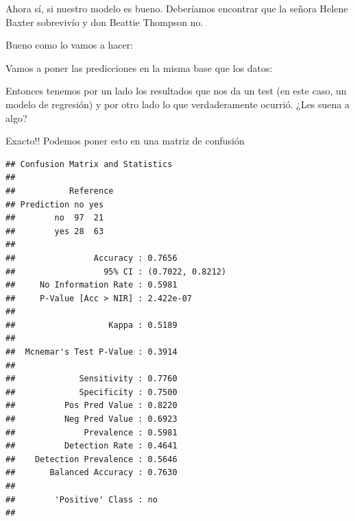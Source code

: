 \documentclass[
]{book}
\newenvironment{Shaded}{\begin{snugshade}}{\end{snugshade}}
\newcommand{\AttributeTok}[1]{\textcolor[rgb]{0.77,0.63,0.00}{#1}}
\newcommand{\FunctionTok}[1]{\textcolor[rgb]{0.00,0.00,0.00}{#1}}
\newcommand{\NormalTok}[1]{#1}
\newcommand{\OtherTok}[1]{\textcolor[rgb]{0.56,0.35,0.01}{#1}}
\newcommand{\SpecialCharTok}[1]{\textcolor[rgb]{0.00,0.00,0.00}{#1}}
\begin{document}
Ahora sí, si nuestro modelo es bueno. Deberíamos encontrar que la señora Helene Baxter sobrevivío y don Beattie Thompson no.

Bueno como lo vamos a hacer:

Vamos a poner las predicciones en la misma base que los datos:

\begin{Shaded}
\end{Shaded}

Entonces tenemos por un lado los resultados que nos da un test (en este caso, un modelo de regresión) y por otro lado lo que verdaderamente ocurrió. ¿Les suena a algo?

Exacto!! Podemos poner esto en una matriz de confusión

\begin{Shaded}
\end{Shaded}

\begin{verbatim}
## Confusion Matrix and Statistics
## 
##           Reference
## Prediction no yes
##        no  97  21
##        yes 28  63
##                                           
##                Accuracy : 0.7656          
##                  95% CI : (0.7022, 0.8212)
##     No Information Rate : 0.5981          
##     P-Value [Acc > NIR] : 2.422e-07       
##                                           
##                   Kappa : 0.5189          
##                                           
##  Mcnemar's Test P-Value : 0.3914          
##                                           
##             Sensitivity : 0.7760          
##             Specificity : 0.7500          
##          Pos Pred Value : 0.8220          
##          Neg Pred Value : 0.6923          
##              Prevalence : 0.5981          
##          Detection Rate : 0.4641          
##    Detection Prevalence : 0.5646          
##       Balanced Accuracy : 0.7630          
##                                           
##        'Positive' Class : no              
## 
\end{verbatim}
\end{document}
